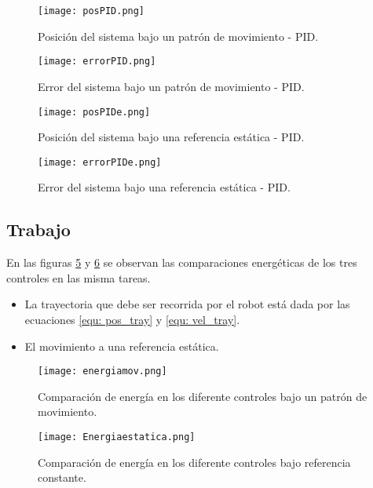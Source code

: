 \begin{figure}[H]
    \centering
    \texttt{[image: posPID.png]}
    \caption{Posición del sistema bajo un patrón de movimiento - PID.}
    \label{fig:PID position}
\end{figure}

\begin{figure}[H]
    \centering
    \texttt{[image: errorPID.png]}
    \caption{Error del sistema bajo un patrón de movimiento - PID.}
    \label{fig:PID error}
\end{figure}

\begin{figure}[H]
    \centering
    \texttt{[image: posPIDe.png]}
    \caption{Posición del sistema bajo una referencia estática - PID.}
    \label{fig:PID positione}
\end{figure}

\begin{figure}[H]
    \centering
    \texttt{[image: errorPIDe.png]}
    \caption{Error del sistema bajo una referencia estática - PID.}
    \label{fig:PID errore}
\end{figure}



\subsection{Trabajo}

En las figuras \ref{fig:energiamov} y \ref{fig:energiaest} se observan las comparaciones energéticas de los tres controles en las misma tareas. 

\begin{itemize}
    \item La trayectoria que debe ser recorrida por el robot está dada por las ecuaciones \ref{equ: pos_tray} y \ref{equ: vel_tray}.
    \item El movimiento a una referencia estática. 
\end{itemize}

\begin{figure}[H]
    \centering
    \texttt{[image: energiamov.png]}
    \caption{Comparación de energía en los diferente controles bajo un patrón de movimiento.}
    \label{fig:energiamov}
\end{figure}

\begin{figure}[H]
    \centering
    \texttt{[image: Energiaestatica.png]}
    \caption{Comparación de energía en los diferente controles bajo referencia constante.}
    \label{fig:energiaest}
\end{figure}

